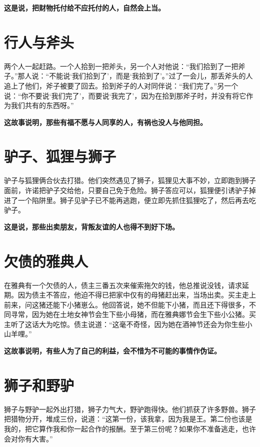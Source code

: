 {\bfseries \color{red}这是说，把财物托付给不应托付的人，自然会上当。}

\section{行人与斧头}

两个人一起赶路。一个人拾到一把斧头，另一个人对他说：“我们拾到了一把斧子。”那人说：“不能说‘我们拾到了’，而是‘我拾到了’。”过了一会儿，那丢斧头的人追上了他们，斧子被要了回去。拾到斧子的人对同伴说：“我们完了。”另一个说：“你不要说‘我们完了’，而要说‘我完了’，因为在拾到那斧子时，并没有将它作为我们共有的东西呀。”

{\bfseries \color{red}这故事说明，那些有福不愿与人同享的人，有祸也没人与他同担。}

\section{驴子、狐狸与狮子}

驴子与狐狸俩合伙去打猎。他们突然遇见了狮子，狐狸见大事不妙，立即跑到狮子面前，许诺把驴子交给他，只要自己免于危险。狮子答应可以，狐狸便引诱驴子掉进了一个陷阱里。狮子见驴子已不能再逃跑，便立即先抓住狐狸吃了，然后再去吃驴子。

{\bfseries \color{red}这是说，那些出卖朋友，背叛友谊的人也得不到好下场。}

\section{欠债的雅典人}

在雅典有一个欠债的人，债主三番五次来催索拖欠的钱，他总推说没钱，请求延期。因为债主不答应，他迫不得已把家中仅有的母猪赶出来，当场出卖。买主走上前来，问这猪还能下小猪崽么。他回答说，她不但能下小猪，而且还下得很多，不同寻常，因为她在土地女神节会生下些小母猪，而在雅典娜节会生下些小公猪。买主听了这话大为吃惊。债主说道：“这毫不奇怪，因为她在酒神节还会为你生些小山羊哩。”

{\bfseries \color{red}这故事说明，有些人为了自己的利益，会不惜为不可能的事情作伪证。}

\section{狮子和野驴}

狮子与野驴一起外出打猎，狮子力气大，野驴跑得快。他们抓获了许多野兽。狮子把猎物分开，堆成三份，说道：“这第一份，该我拿，因为我是王。第二份也该是我的，把它算作我和你一起合作的报酬。至于第三份呢？如果你不准备逃走，也许会对你有大害。”

